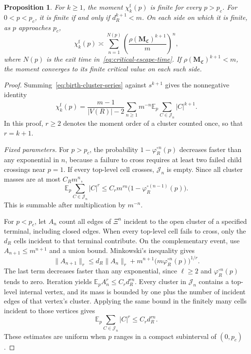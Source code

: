 \documentclass[scheme=plain,11pt]{ctexart}
\newtheorem{proposition}[theorem]{Proposition}
\theoremstyle{definition}
\theoremstyle{remark}
\begin{document}
\begin{proposition}\label{prop:annealed-moments}
For $k\ge1$, the moment $\chi_k^{\mathrm f}(p)$ is finite for every $p>p_c$.
For $0<p<p_c$, it is finite if and only if $d_R^{k+1}<m$.
On each side on which it is finite, as $p$ approaches $p_c$,
\begin{equation}\label{eq:near-critical-moment-sum}
 \chi_k^{\mathrm f}(p)\asymp
 \sum_{n=1}^{N(p)}
 \left(\frac{\rho(\mathbf M_{\mathfrak C})^{k+1}}m\right)^n,
\end{equation}
where $N(p)$ is the exit time in~\eqref{eq:critical-escape-time}.
If $\rho(\mathbf M_{\mathfrak C})^{k+1}<m$, the moment converges to its finite critical value on each such side.
\end{proposition}
\begin{proof}
Summing~\eqref{eq:birth-cluster-series} against $s^{k+1}$ gives the nonnegative identity
\begin{equation}\label{eq:birth-moment-series}
 \chi_k^{\mathrm f}(p)=\frac{m-1}{|V(R)|-2}
 \sum_{n\ge1}m^{-n}\mathbb E_p
 \sum_{C\in\mathcal J_n}|C|^{k+1}.
\end{equation}
In this proof, $r\ge2$ denotes the moment order of a cluster counted once, so that $r=k+1$.

\emph{Fixed parameters.}
For $p>p_c$, the probability $1-\varphi_R^{\circ n}(p)$ decreases faster than any exponential in $n$, because a failure to cross requires at least two failed child crossings near $p=1$.
If every top-level cell crosses, $\mathcal J_n$ is empty.
Since all cluster masses are at most $C_Rm^n$,
\[
 \mathbb E_p\sum_{C\in\mathcal J_n}|C|^r
 \le C_rm^{rn}\bigl(1-\varphi_R^{\circ(n-1)}(p)\bigr).
\]
This is summable after multiplication by $m^{-n}$.

For $p<p_c$, let $A_n$ count all edges of $\Xi^n$ incident to the open cluster of a specified terminal, including closed edges.
When every top-level cell fails to cross, only the $d_R$ cells incident to that terminal contribute.
On the complementary event, use $A_{n+1}\le m^{n+1}$ and a union bound.
Minkowski's inequality gives
\[
 \|A_{n+1}\|_r\le d_R\|A_n\|_r
 +m^{n+1}\bigl(m\varphi_R^{\circ n}(p)\bigr)^{1/r}.
\]
The last term decreases faster than any exponential, since $\ell\ge2$ and $\varphi_R^{\circ n}(p)$ tends to zero.
Iteration yields $\mathbb E_p A_n^r\le C_rd_R^{rn}$.
Every cluster in $\mathcal J_n$ contains a top-level internal vertex, and its mass is bounded by one plus the number of incident edges of that vertex's cluster.
Applying the same bound in the finitely many cells incident to those vertices gives
\[
 \mathbb E_p\sum_{C\in\mathcal J_n}|C|^r\le C_rd_R^{rn}.
\]
These estimates are uniform when $p$ ranges in a compact subinterval of $(0,p_c)$.


\end{proof}
\end{document}
